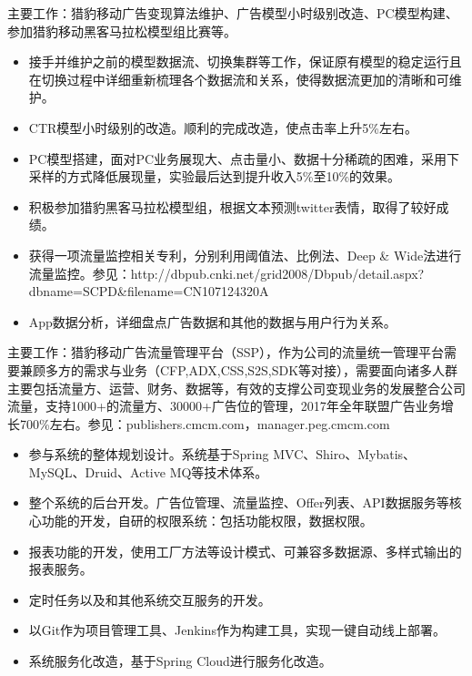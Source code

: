 \documentclass{resume}
\begin{document}
\begin{onehalfspacing}
主要工作：猎豹移动广告变现算法维护、广告模型小时级别改造、PC模型构建、参加猎豹移动黑客马拉松模型组比赛等。
\begin{itemize}
  \item 接手并维护之前的模型数据流、切换集群等工作，保证原有模型的稳定运行且在切换过程中详细重新梳理各个数据流和关系，使得数据流更加的清晰和可维护。 
  \item CTR模型小时级别的改造。顺利的完成改造，使点击率上升5\%左右。
  \item PC模型搭建，面对PC业务展现大、点击量小、数据十分稀疏的困难，采用下采样的方式降低展现量，实验最后达到提升收入5\%至10\%的效果。
  \item 积极参加猎豹黑客马拉松模型组，根据文本预测twitter表情，取得了较好成绩。
  \item 获得一项流量监控相关专利，分别利用阈值法、比例法、Deep \& Wide法进行流量监控。参见：http://dbpub.cnki.net/grid2008/Dbpub/detail.aspx?dbname=SCPD\&filename=CN107124320A
  \item App数据分析，详细盘点广告数据和其他的数据与用户行为关系。      
\end{itemize}
\end{onehalfspacing}


\begin{onehalfspacing}
主要工作：猎豹移动广告流量管理平台（SSP），作为公司的流量统一管理平台需要兼顾多方的需求与业务（CFP,ADX,CSS,S2S,SDK等对接），需要面向诸多人群主要包括流量方、运营、财务、数据等，有效的支撑公司变现业务的发展整合公司流量，支持1000+的流量方、30000+广告位的管理，2017年全年联盟广告业务增长700\%左右。参见：publishers.cmcm.com，manager.peg.cmcm.com
\begin{itemize}
  \item 参与系统的整体规划设计。系统基于Spring MVC、Shiro、Mybatis、MySQL、Druid、Active MQ等技术体系。
  \item 整个系统的后台开发。广告位管理、流量监控、Offer列表、API数据服务等核心功能的开发，自研的权限系统：包括功能权限，数据权限。
  \item 报表功能的开发，使用工厂方法等设计模式、可兼容多数据源、多样式输出的报表服务。
  \item 定时任务以及和其他系统交互服务的开发。
  \item 以Git作为项目管理工具、Jenkins作为构建工具，实现一键自动线上部署。
  \item 系统服务化改造，基于Spring Cloud进行服务化改造。 
\end{itemize}
\end{onehalfspacing}
\end{document}
